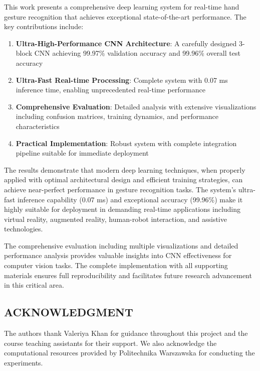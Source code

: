 \documentclass[11pt,a4paper,twoside]{article}
\providecommand{\tightlist}{%
  \setlength{\itemsep}{0pt}\setlength{\parskip}{0pt}}
\begin{document}
This work presents a comprehensive deep learning system for real-time
hand gesture recognition that achieves exceptional state-of-the-art
performance. The key contributions include:

\begin{enumerate}
\def\labelenumi{\arabic{enumi}.}
\tightlist
\item
  \textbf{Ultra-High-Performance CNN Architecture}: A carefully designed
  3-block CNN achieving 99.97\% validation accuracy and 99.96\% overall
  test accuracy
\item
  \textbf{Ultra-Fast Real-time Processing}: Complete system with 0.07 ms
  inference time, enabling unprecedented real-time performance
\item
  \textbf{Comprehensive Evaluation}: Detailed analysis with extensive
  visualizations including confusion matrices, training dynamics, and
  performance characteristics
\item
  \textbf{Practical Implementation}: Robust system with complete
  integration pipeline suitable for immediate deployment
\end{enumerate}

The results demonstrate that modern deep learning techniques, when
properly applied with optimal architectural design and efficient
training strategies, can achieve near-perfect performance in gesture
recognition tasks. The system's ultra-fast inference capability (0.07
ms) and exceptional accuracy (99.96\%) make it highly suitable for
deployment in demanding real-time applications including virtual
reality, augmented reality, human-robot interaction, and assistive
technologies.

The comprehensive evaluation including multiple visualizations and
detailed performance analysis provides valuable insights into CNN
effectiveness for computer vision tasks. The complete implementation
with all supporting materials ensures full reproducibility and
facilitates future research advancement in this critical area.

\subsection{ACKNOWLEDGMENT}\label{acknowledgment}

The authors thank Valeriya Khan for guidance throughout this project and the course teaching assistants for their support. We also acknowledge the computational resources provided by Politechnika Warszawska for conducting the experiments.
\end{document}

